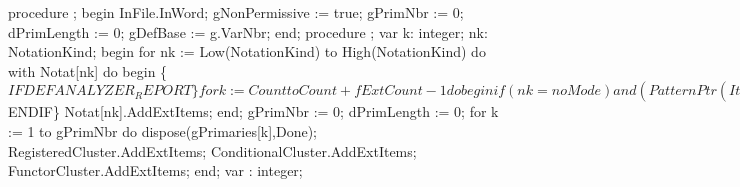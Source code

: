 procedure ;
begin
   InFile.InWord;
   gNonPermissive := true;
   gPrimNbr := 0;
   dPrimLength := 0;
   gDefBase := g.VarNbr;
end;
\eatline
{}\nwendcode{}\nwdocspar
\nwenddocs{}\endmoddef\nwstartdeflinemarkup{}\nwenddeflinemarkup
procedure ;
var
   k: integer;
   nk: NotationKind;
begin
   for nk := Low(NotationKind) to High(NotationKind) do
      with Notat[nk] do
   begin
      \{$IFDEF ANALYZER_REPORT\}
      for k :=  Count to Count + fExtCount - 1 do
      begin
         if (nk = noMode) and (PatternPtr(Items^[k])^.Expansion <> nil) then
         begin
            PatternPtr(Items^[k])^.Expansion^.LowerCluster^.ClearPids;
            PatternPtr(Items^[k])^.Expansion^.UpperCluster^.ClearPids;
         end;
      end;
      \{$ENDIF\}
      Notat[nk].AddExtItems;
   end;
   gPrimNbr := 0;
   dPrimLength := 0;
   for k := 1 to gPrimNbr do
      dispose(gPrimaries[k],Done);
   RegisteredCluster.AddExtItems;
   ConditionalCluster.AddExtItems;
   FunctorCluster.AddExtItems;
end;
\eatline
{}\nwendcode{}\nwdocspar
\nwenddocs{}\endmoddef\nwstartdeflinemarkup{}\nwenddeflinemarkup
var : integer;

